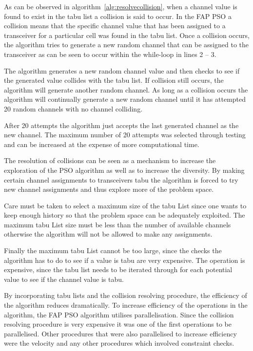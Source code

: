 As can be observed in algorithm~\ref{alg:resolvecollision}, when a channel value is found to exist in the tabu list a collision is said to occur. In the FAP PSO a collision means that the specific channel value that has been assigned to a transceiver for a particular cell was found in the tabu list. Once a collision occurs, the algorithm tries to generate a new random channel that can be assigned to the transceiver as can be seen to occur within the while-loop in lines 2 -- 3.

The algorithm generates a new random channel value and then checks to see if the generated value collides with the tabu list. If collision still occurs, the algorithm will generate another random channel. As long as a collision occurs the algorithm will continually generate a new random channel until it has attempted 20 random channels with no channel colliding. 

After 20 attempts the algorithm just accepts the last generated channel as the new channel. The maximum number of 20  attempts was selected through testing and can be increased at the expense of more computational time. 

The resolution of collisions can be seen as a mechanism to increase the exploration of the PSO algorithm as well as to increase the diversity. By making certain channel assignments to transceivers tabu the algorithm is forced to try new channel assignments and thus explore more of the problem space.

Care must be taken to select a maximum size of the tabu List since one wants to keep enough history so that the problem space can be adequately exploited. The maximum tabu List size must be less than the number of available channels otherwise the algorithm will not be allowed to make any assignments. 

Finally the maximum tabu List cannot be too large, since the checks the algorithm has to do to see if a value is tabu are very expensive. The operation is expensive, since the tabu list needs to be iterated through for each potential value to see if the channel value is tabu.

By incorporating tabu lists and the collision resolving procedure, the efficiency of the algorithm reduces dramatically. To increase efficiency of the operations in the algorithm, the FAP PSO algorithm utilises parallelisation. Since the collision resolving procedure is very expensive it was one of the first operations to be parallelised. Other procedures that were also parallelised to increase efficiency were the velocity and any other procedures which involved constraint checks.

